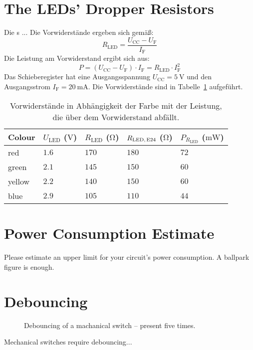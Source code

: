 \documentclass[12pt,fleqn,parskip=half,twoside,toc=index,headings=small,a4paper]{scrreprt}
\begin{document}
	\section{The LEDs' Dropper Resistors}
	Die s ...
	Die Vorwiderstände ergeben sich gemäß:
	\begin{equation}
	R_{\text{LED}} = \frac{U_\text{CC} - U_\text{F}}{I_\text{F}}
	\end{equation}
	Die Leistung am Vorwiderstand ergibt sich aus:
	\begin{equation}
	P = (U_\text{CC} - U_\text{F}) \cdot I_\text{F} = R_{\text{LED}} \cdot I_\text{F}^2 
	\end{equation}
	Das Schieberegister hat eine Ausgangsspannung $U_\text{CC} = \SI{5}{\volt}$ und den Ausgangsstrom $I_\text{F} = \SI{20}{\milli\ampere}$.
	Die Vorwiderstände sind in Tabelle~\ref{tab:Rled} aufgeführt.
	\begin{table}[H]
		\caption{Vorwiderstände in Abhängigkeit der Farbe mit der Leistung, die über dem Vorwiderstand abfällt. }
		\label{tab:Rled}
		\centering
		\begin{tabular}{@{}lllll@{}}
		\toprule
			Colour	& 	$U_\text{LED}$ ($\si{\volt}$)	& 	$R_\text{LED}$ ($\si{\ohm}$)	& 	$R_\text{LED,\,E24}$ ($\si{\ohm}$) 	&	$P_{R_\text{LED}}$ ($\si{\mW}$)		\\
		\midrule
			red		&	$\num{1.6}$			&	$\num{170}$		&	$\num{180}$			&	$\num{72}$	\\
			green	&	$\num{2.1}$			&	$\num{145}$		&	$\num{150}$			&	$\num{60}$	\\
			yellow	&	$\num{2.2}$			&	$\num{140}$		&	$\num{150}$			&	$\num{60}$	\\
			blue	&	$\num{2.9}$			&	$\num{105}$		&	$\num{110}$			&	$\num{44}$	\\
		\bottomrule
		\end{tabular}
	\end{table}
	\section{Power Consumption Estimate}
	Please estimate an upper limit for your circuit's power consumption.
	A ballpark figure is enough.
	\section{Debouncing}
	\begin{figure}[h]
		\centering
		\caption{Debouncing of a machanical switch -- present five times.}
	\end{figure}
	Mechanical switches require debouncing...
	
\end{document}
